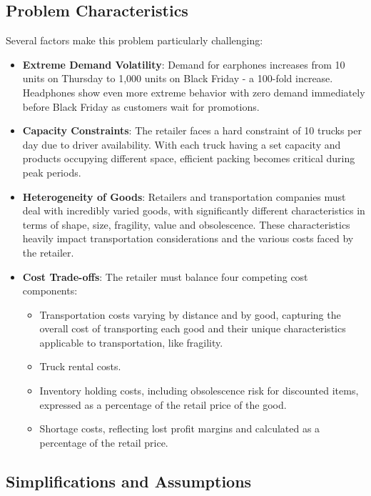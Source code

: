\documentclass[a4paper,12pt]{article}
\begin{document}
\subsection{Problem Characteristics}\label{subsec:problem-characteristics}

Several factors make this problem particularly challenging:

\begin{itemize}
    \item \textbf{Extreme Demand Volatility}: Demand for earphones increases from 10 units on Thursday to 1,000 units on Black Friday - a 100-fold increase.
Headphones show even more extreme behavior with zero demand immediately before Black Friday as customers wait for promotions.
    \item \textbf{Capacity Constraints}: The retailer faces a hard constraint of 10 trucks per day due to driver availability.
With each truck having a set capacity and products occupying different space, efficient packing becomes critical during peak periods.
    \item \textbf{Heterogeneity of Goods}: Retailers and transportation companies must deal with incredibly varied goods, with significantly different characteristics in terms of shape, size, fragility, value and obsolescence.
These characteristics heavily impact transportation considerations and the various costs faced by the retailer.
    \item \textbf{Cost Trade-offs}: The retailer must balance four competing cost components:
    \begin{itemize}
        \item Transportation costs varying by distance and by good, capturing the overall cost of transporting each good and their unique characteristics applicable to transportation, like fragility.
        \item Truck rental costs.
        \item Inventory holding costs, including obsolescence risk for discounted items, expressed as a percentage of the retail price of the good.
        \item Shortage costs, reflecting lost profit margins and calculated as a percentage of the retail price.
    \end{itemize}
\end{itemize}

\subsection{Simplifications and Assumptions}\label{subsec:simplifications-and-assumptions}
\end{document}
